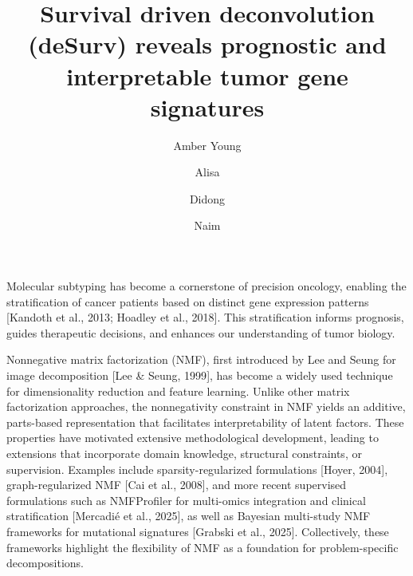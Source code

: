 \documentclass[9pt,twocolumn,twoside,]{pnas-new}
\title{Survival driven deconvolution (deSurv) reveals prognostic and
interpretable tumor gene signatures}
\author[a,1,2]{Amber Young}
\author[b]{Alisa}
\author[a]{Didong}
\author[a,c]{Naim}
\affil[a]{University of North Carolina at Chapel Hill, Department,
Street, City, State, Zip}
\affil[b]{Another University Department, Street, City, State, Zip}
\begin{document}
\verticaladjustment{-2pt}



\maketitle
\thispagestyle{firststyle}



Molecular subtyping has become a cornerstone of precision oncology,
enabling the stratification of cancer patients based on distinct gene
expression patterns {[}Kandoth et al., 2013; Hoadley et al., 2018{]}.
This stratification informs prognosis, guides therapeutic decisions, and
enhances our understanding of tumor biology.

Nonnegative matrix factorization (NMF), first introduced by Lee and
Seung for image decomposition {[}Lee \& Seung, 1999{]}, has become a
widely used technique for dimensionality reduction and feature learning.
Unlike other matrix factorization approaches, the nonnegativity
constraint in NMF yields an additive, parts-based representation that
facilitates interpretability of latent factors. These properties have
motivated extensive methodological development, leading to extensions
that incorporate domain knowledge, structural constraints, or
supervision. Examples include sparsity-regularized formulations
{[}Hoyer, 2004{]}, graph-regularized NMF {[}Cai et al., 2008{]}, and
more recent supervised formulations such as NMFProfiler for multi-omics
integration and clinical stratification {[}Mercadié et al., 2025{]}, as
well as Bayesian multi-study NMF frameworks for mutational signatures
{[}Grabski et al., 2025{]}. Collectively, these frameworks highlight the
flexibility of NMF as a foundation for problem-specific decompositions.
\end{document}
